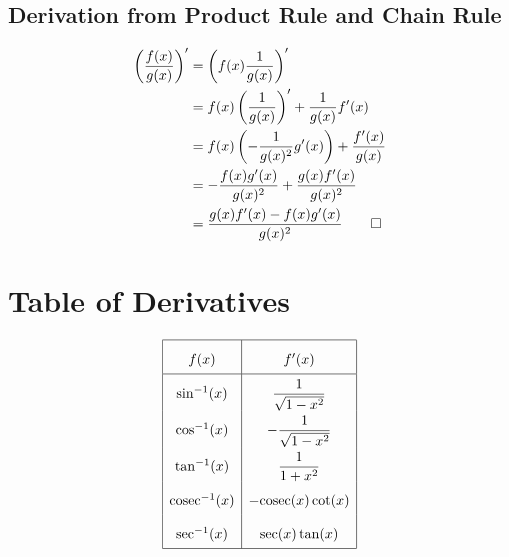 \documentclass[a4paper]{article}
\newcommand{\cosec}{\mathrm{cosec}}
\begin{document}
\subsection{Derivation from Product Rule and Chain Rule}

\[\begin{aligned}
    \left(\frac{f(x)}{g(x)}\right)^\prime
    &=\left(f(x)\frac1{g(x)}\right)^\prime\\
    &=f(x)\left(\frac1{g(x)}\right)^\prime+\frac1{g(x)}f^\prime(x)\\
    &=f(x)\left(-\frac1{g(x)^2}g^\prime(x)\right)+\frac{f^\prime(x)}{g(x)}\\
    &=-\frac{f(x)g^\prime(x)}{g(x)^2}+\frac{g(x)f^\prime(x)}{g(x)^2}\\
    &=\frac{g(x)f^\prime(x)-f(x)g^\prime(x)}{g(x)^2}\qed
\end{aligned}\]

\section{Table of Derivatives}

\[\def\arraystretch{2}
\begin{array}[t]{|c|c|}
    \hline
    f(x)&f^\prime(x)\\
    \hline
    \sin^{-1}(x)&\displaystyle\frac1{\sqrt{1-x^2}}\\
    \cos^{-1}(x)&\displaystyle-\frac1{\sqrt{1-x^2}}\\
    \tan^{-1}(x)&\displaystyle\frac1{1+x^2}\\
    \cosec^{-1}(x)&\displaystyle-\cosec(x)\cot(x)\\
    \sec^{-1}(x)&\displaystyle\sec(x)\tan(x)\\
    \hline
\end{array}\]
\end{document}
